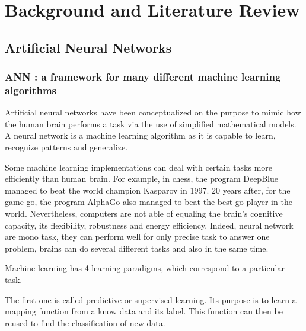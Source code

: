 
\chapter{Background and Literature Review} %

\label{Chapter2} %




\section{Artificial Neural Networks}
\subsection{ANN : a framework for many different machine learning algorithms}

Artificial neural networks have been conceptualized on the purpose to mimic how the human brain performs a task via the use of simplified mathematical models. A neural network is a machine learning algorithm as it is capable to learn, recognize patterns and generalize. 

Some machine learning implementations can deal with certain tasks more efficiently than human brain. For example, in chess, the program DeepBlue managed to beat the world champion Kasparov in 1997. 20 years after, for the game go, the program AlphaGo also managed to beat the best go player in the world. Nevertheless, computers are not able of equaling the brain's cognitive capacity, its flexibility, robustness and energy efficiency. Indeed, neural network are mono task, they can perform well for only precise task to answer one problem, brains can do several different tasks and also in the same time.

Machine learning has 4 learning paradigms, which correspond to a particular task.

The first one is called predictive or supervised learning. Its purpose is to learn a mapping function from a know data and its label. This function can then be reused to find the classification of new data. 

